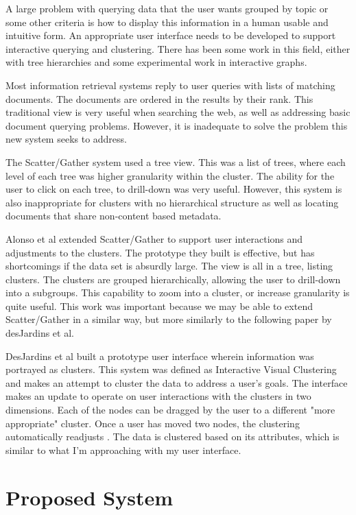 \documentclass[11pt]{article}
\begin{document}
A large problem with querying data that the user wants grouped by topic or some other criteria is how to display this information in a human usable and intuitive form.
An appropriate user interface needs to be developed to support interactive querying and clustering.
There has been some work in this field, either with tree hierarchies and some experimental work in interactive graphs.

Most information retrieval systems reply to user queries with lists of matching documents.
The documents are ordered in the results by their rank.
This traditional view is very useful when searching the web, as well as addressing basic document querying problems.
However, it is inadequate to solve the problem this new system seeks to address.

The Scatter/Gather system used a tree view.
This was a list of trees, where each level of each tree was higher granularity within the cluster.
The ability for the user to click on each tree, to drill-down was very useful.
However, this system is also inappropriate for clusters with no hierarchical structure as well as locating documents that share non-content based metadata.

Alonso et al \cite{Alonso2008} extended Scatter/Gather to support user interactions and adjustments to the clusters.
The prototype they built is effective, but has shortcomings if the data set is absurdly large.
The view is all in a tree, listing clusters.
The clusters are grouped hierarchically, allowing the user to drill-down into a subgroups.
This capability to zoom into a cluster, or increase granularity is quite useful.
This work was important because we may be able to extend Scatter/Gather in a similar way, but more similarly to the following paper by desJardins et al.

DesJardins et al built a prototype user interface wherein information was portrayed as clusters.
This system was defined as Interactive Visual Clustering and makes an attempt to cluster the data to address a user's goals.
The interface makes an update to operate on user interactions with the clusters in two dimensions.
Each of the nodes can be dragged by the user to a different "more appropriate" cluster.
Once a user has moved two nodes, the clustering automatically readjusts \cite{desJardins2007}.
The data is clustered based on its attributes, which is similar to what I'm approaching with my user interface.

\section{Proposed System}
\end{document}
